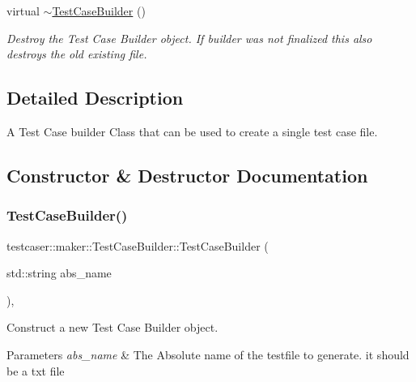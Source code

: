 \begin{DoxyCompactItemize}
virtual \mbox{\hyperlink{classtestcaser_1_1maker_1_1TestCaseBuilder_ad463fd2e4c6175c15c310c4af66ec344}{$\sim$\+Test\+Case\+Builder}} ()
\begin{DoxyCompactList}\small\item\em Destroy the Test Case Builder object. If builder was not finalized this also destroys the old existing file. \end{DoxyCompactList}\end{DoxyCompactItemize}


\subsection{Detailed Description}
A Test Case builder Class that can be used to create a single test case file. 



\subsection{Constructor \& Destructor Documentation}
\mbox{\label{classtestcaser_1_1maker_1_1TestCaseBuilder_a1faa00929cc5be8c8bbb312541858e61}} 
\subsubsection{\texorpdfstring{TestCaseBuilder()}{TestCaseBuilder()}}
{\footnotesize\ttfamily testcaser\+::maker\+::\+Test\+Case\+Builder\+::\+Test\+Case\+Builder (\begin{DoxyParamCaption}\item[{std\+::string}]{abs\+\_\+name }\end{DoxyParamCaption})\hspace{0.3cm}{\ttfamily [inline]}, {\ttfamily [explicit]}}



Construct a new Test Case Builder object. 


\begin{DoxyParams}{Parameters}
{\em abs\+\_\+name} & The Absolute name of the testfile to generate. it should be a txt file \\
\hline
\end{DoxyParams}
\mbox{\label{classtestcaser_1_1maker_1_1TestCaseBuilder_ad463fd2e4c6175c15c310c4af66ec344}} 
